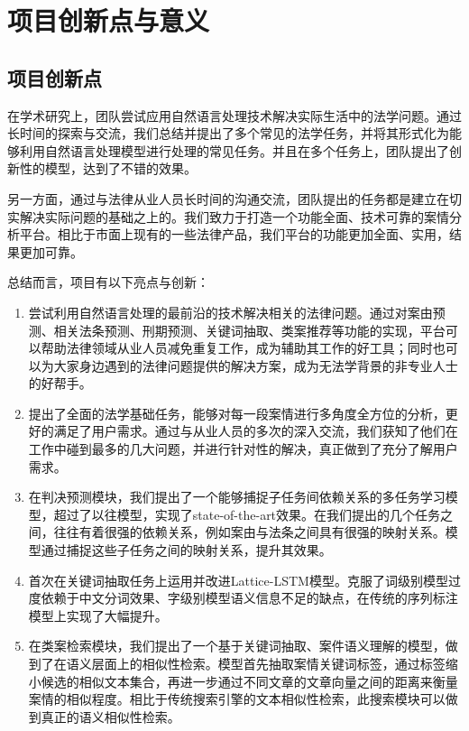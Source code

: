 \chapter{项目创新点与意义}
\label{cha: significance}

\section{项目创新点}

在学术研究上，团队尝试应用自然语言处理技术解决实际生活中的法学问题。通过长时间的探索与交流，我们总结并提出了多个常见的法学任务，并将其形式化为能够利用自然语言处理模型进行处理的常见任务。并且在多个任务上，团队提出了创新性的模型，达到了不错的效果。

另一方面，通过与法律从业人员长时间的沟通交流，团队提出的任务都是建立在切实解决实际问题的基础之上的。我们致力于打造一个功能全面、技术可靠的案情分析平台。相比于市面上现有的一些法律产品，我们平台的功能更加全面、实用，结果更加可靠。

总结而言，项目有以下亮点与创新：
\begin{enumerate}[1)]
	\item 尝试利用自然语言处理的最前沿的技术解决相关的法律问题。通过对案由预测、相关法条预测、刑期预测、关键词抽取、类案推荐等功能的实现，平台可以帮助法律领域从业人员减免重复工作，成为辅助其工作的好工具；同时也可以为大家身边遇到的法律问题提供的解决方案，成为无法学背景的非专业人士的好帮手。
	\item 提出了全面的法学基础任务，能够对每一段案情进行多角度全方位的分析，更好的满足了用户需求。通过与从业人员的多次的深入交流，我们获知了他们在工作中碰到最多的几大问题，并进行针对性的解决，真正做到了充分了解用户需求。
	\item 在判决预测模块，我们提出了一个能够捕捉子任务间依赖关系的多任务学习模型，超过了以往模型，实现了state-of-the-art效果。在我们提出的几个任务之间，往往有着很强的依赖关系，例如案由与法条之间具有很强的映射关系。模型通过捕捉这些子任务之间的映射关系，提升其效果。
	\item 首次在关键词抽取任务上运用并改进Lattice-LSTM模型。克服了词级别模型过度依赖于中文分词效果、字级别模型语义信息不足的缺点，在传统的序列标注模型上实现了大幅提升。
	\item 在类案检索模块，我们提出了一个基于关键词抽取、案件语义理解的模型，做到了在语义层面上的相似性检索。模型首先抽取案情关键词标签，通过标签缩小候选的相似文本集合，再进一步通过不同文章的文章向量之间的距离来衡量案情的相似程度。相比于传统搜索引擎的文本相似性检索，此搜索模块可以做到真正的语义相似性检索。
\end{enumerate}

